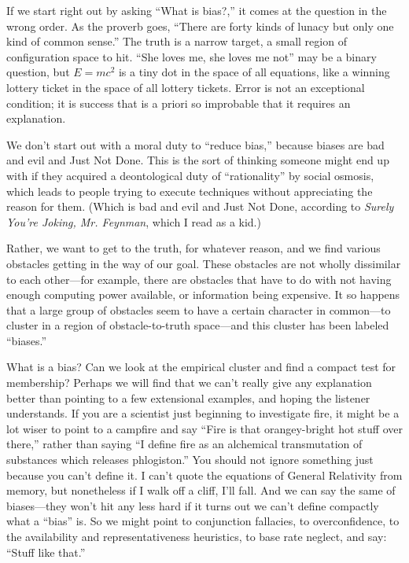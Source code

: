 {
 If we start right out by asking ``What is
bias?,'' it comes at the question in the wrong order.
As the proverb goes, ``There are forty kinds of lunacy
but only one kind of common sense.'' The truth is a
narrow target, a small region of configuration space to hit.
``She loves me, she loves me not''
may be a binary question, but $E = mc^2$ is a tiny dot
in the space of all equations, like a winning lottery ticket in the
space of all lottery tickets. Error is not an exceptional condition; it
is success that is a priori so improbable that it requires an
explanation.}

{
 We don't start out with a moral duty to
``reduce bias,'' because biases are
bad and evil and Just Not Done. This is the sort of thinking someone
might end up with if they acquired a deontological duty of
``rationality'' by social osmosis,
which leads to people trying to execute techniques without appreciating
the reason for them. (Which is bad and evil and Just Not Done,
according to \textit{Surely You're Joking, Mr.
Feynman}, which I read as a kid.)}

{
 Rather, we want to get to the truth, for whatever reason, and we
find various obstacles getting in the way of our goal. These obstacles
are not wholly dissimilar to each other---for example, there are
obstacles that have to do with not having enough computing power
available, or information being expensive. It so happens that a large
group of obstacles seem to have a certain character in common---to
cluster in a region of obstacle-to-truth space---and this cluster has
been labeled ``biases.''}

{
 What is a bias? Can we look at the empirical cluster and find a
compact test for membership? Perhaps we will find that we
can't really give any explanation better than pointing
to a few extensional examples, and hoping the listener understands. If
you are a scientist just beginning to investigate fire, it might be a
lot wiser to point to a campfire and say ``Fire is
that orangey-bright hot stuff over there,'' rather
than saying ``I define fire as an alchemical
transmutation of substances which releases
phlogiston.'' You should not ignore something just
because you can't define it. I can't
quote the equations of General Relativity from memory, but nonetheless
if I walk off a cliff, I'll fall. And we can say the
same of biases---they won't hit any less hard if it
turns out we can't define compactly what a
``bias'' is. So we might point to
conjunction fallacies, to overconfidence, to the availability and
representativeness heuristics, to base rate neglect, and say:
``Stuff like that.''}

